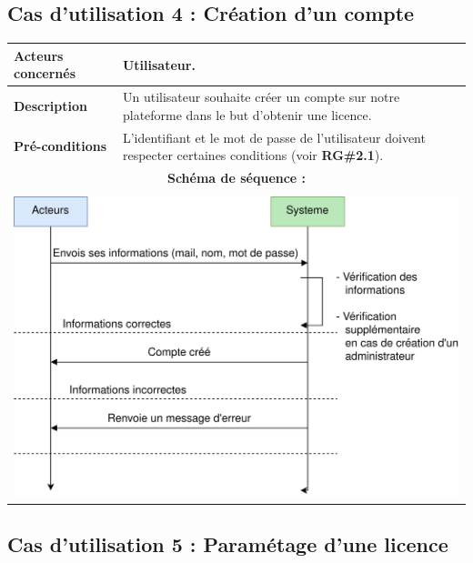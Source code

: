 \subsection{Cas d'utilisation 4 : Création d'un compte}

\begin{table}[!h]
        \centering
        \begin{tabular}{| m{4cm} | m{12cm} |}
                \hline
		    \textbf{Acteurs concernés} & Utilisateur. \\
                \hline
		    \textbf{Description} & Un utilisateur souhaite créer un compte sur notre plateforme dans le but d'obtenir une licence. \\
                \hline
		    \textbf{Pré-conditions} & L'identifiant et le mot de passe de l'utilisateur doivent respecter certaines conditions (voir \textbf{RG\#2.1}).\\
		\hline
		    \multicolumn{2}{|c|}{\textbf{Schéma de séquence :}} \\
                \hline
                    \multicolumn{2}{|c|}{}\\
                    \multicolumn{2}{|c|}{\includegraphics[width=15cm]{main/png/seq_creation.png}} \\
                \hline
        \end{tabular}
        \label{tab:tab4}
\end{table}
\newpage

\subsection{Cas d'utilisation 5 : Paramétage d'une licence}

